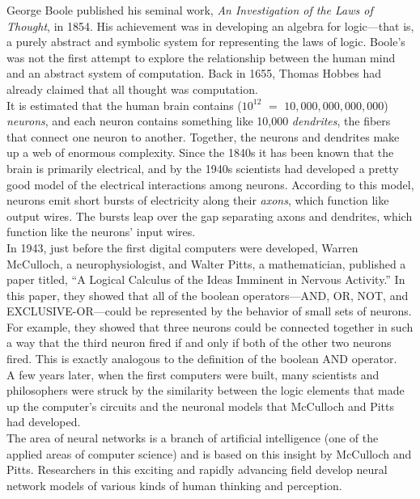{George Boole} published his seminal work, {\it An Investigation of the
Laws of Thought}, in 1854. His achievement was in developing an
algebra for logic---that is, a purely abstract and symbolic system
for representing the laws of logic.  Boole's was not the first attempt
to explore the relationship between the human mind and an abstract
system of computation.  Back in 1655, Thomas Hobbes had already
claimed that all thought was computation.\\
\hspace*{1pc}It is estimated that the human brain contains ($10^{12}$ $=$
$10{,}000{,}000{,}000{,}000$) {\it neurons}, and each neuron contains something
like 10,000 {\it dendrites}, the fibers that connect one neuron to
another.  Together, the neurons and dendrites make up a web of enormous
complexity.  Since the 1840s it has been known that the brain is
primarily electrical, and by the 1940s scientists had developed a
pretty good model of the electrical interactions among
neurons.  According to this model, neurons emit short bursts of
electricity along their {\it axons}, which function like output
wires.  The bursts leap over the gap separating axons and dendrites,
which function like the neurons' input wires.\\
\hspace*{1pc}In 1943, just before the first digital computers were developed,
Warren McCulloch, a neurophysiologist, and Walter Pitts, a
mathematician, published a paper titled, ``A Logical Calculus of the
Ideas Imminent in Nervous Activity.'' In this paper, they showed that
all of the boolean operators---AND, OR, NOT, and EXCLUSIVE-OR---could be represented 
by the behavior of small sets of neurons.   For
example, they showed that three neurons could be connected together in
such a way that the third neuron fired if and only if both of the
other two neurons fired.   This is exactly analogous to the definition
of the boolean AND operator.\\
\hspace*{1pc}A few years later, when the first computers were built, many
scientists and philosophers were struck by the similarity between the
logic elements that made up the computer's circuits and
the neuronal models that McCulloch and Pitts had developed.\\
\hspace*{1pc}The area of neural networks is a branch of artificial intelligence (one
of the applied areas of computer science) and is based on this insight
by McCulloch and Pitts.  Researchers in this exciting and rapidly
advancing field develop neural network models of various kinds of
human thinking and perception.

